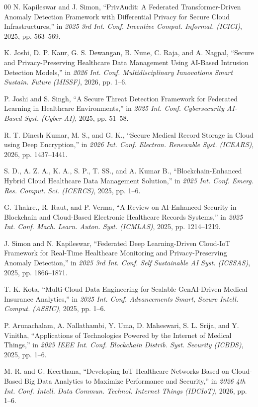 \documentclass{ieeeaccess}
\begin{document}
\begin{thebibliography}{00}
 N. Kapileswar and J. Simon, ``PrivAudit: A Federated Transformer-Driven Anomaly Detection Framework with Differential Privacy for Secure Cloud Infrastructures,'' in \emph{2025 3rd Int. Conf. Inventive Comput. Informat. (ICICI)}, 2025, pp. 563--569.

 K. Joshi, D. P. Kaur, G. S. Dewangan, B. Nune, C. Raja, and A. Nagpal, ``Secure and Privacy-Preserving Healthcare Data Management Using AI-Based Intrusion Detection Models,'' in \emph{2026 Int. Conf. Multidisciplinary Innovations Smart Sustain. Future (MISSF)}, 2026, pp. 1--6.

 P. Joshi and S. Singh, ``A Secure Threat Detection Framework for Federated Learning in Healthcare Environments,'' in \emph{2025 Int. Conf. Cybersecurity AI-Based Syst. (Cyber-AI)}, 2025, pp. 51--58.

 R. T. Dinesh Kumar, M. S., and G. K., ``Secure Medical Record Storage in Cloud using Deep Encryption,'' in \emph{2026 Int. Conf. Electron. Renewable Syst. (ICEARS)}, 2026, pp. 1437--1441.

 S. D., A. Z. A., K. A., S. P., T. SS., and A. Kumar B., ``Blockchain-Enhanced Hybrid Cloud Healthcare Data Management Solution,'' in \emph{2025 Int. Conf. Emerg. Res. Comput. Sci. (ICERCS)}, 2025, pp. 1--6.

 G. Thakre., R. Raut, and P. Verma, ``A Review on AI-Enhanced Security in Blockchain and Cloud-Based Electronic Healthcare Records Systems,'' in \emph{2025 Int. Conf. Mach. Learn. Auton. Syst. (ICMLAS)}, 2025, pp. 1214--1219.

 J. Simon and N. Kapileswar, ``Federated Deep Learning-Driven Cloud-IoT Framework for Real-Time Healthcare Monitoring and Privacy-Preserving Anomaly Detection,'' in \emph{2025 3rd Int. Conf. Self Sustainable AI Syst. (ICSSAS)}, 2025, pp. 1866--1871.

 T. K. Kota, ``Multi-Cloud Data Engineering for Scalable GenAI-Driven Medical Insurance Analytics,'' in \emph{2025 Int. Conf. Advancements Smart, Secure Intell. Comput. (ASSIC)}, 2025, pp. 1--6.

 P. Arunachalam, A. Nallathambi, Y. Uma, D. Maheswari, S. L. Srija, and Y. Vinitha, ``Applications of Technologies Powered by the Internet of Medical Things,'' in \emph{2025 IEEE Int. Conf. Blockchain Distrib. Syst. Security (ICBDS)}, 2025, pp. 1--6.

 M. R. and G. Keerthana, ``Developing IoT Healthcare Networks Based on Cloud-Based Big Data Analytics to Maximize Performance and Security,'' in \emph{2026 4th Int. Conf. Intell. Data Commun. Technol. Internet Things (IDCIoT)}, 2026, pp. 1--6.


\end{thebibliography}
\end{document}
